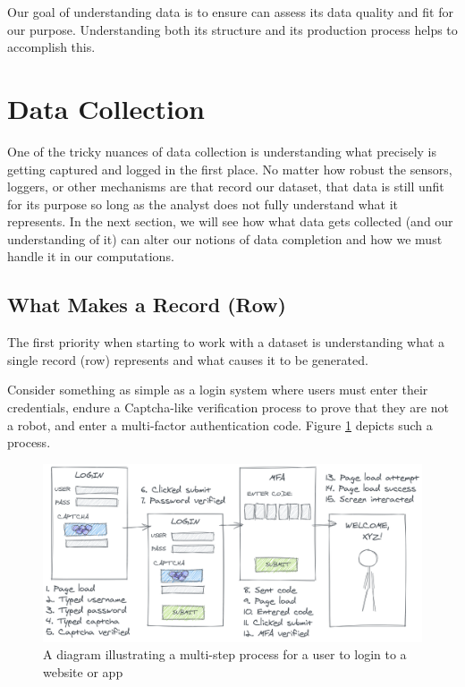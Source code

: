 \documentclass[
]{krantz}
\begin{document}
Our goal of understanding data is to ensure can assess its data quality and fit for our purpose. Understanding both its structure and its production process helps to accomplish this.

\hypertarget{data-collection}{%
\section{Data Collection}\label{data-collection}}

One of the tricky nuances of data collection is understanding what precisely is getting captured and logged in the first place.
No matter how robust the sensors, loggers, or other mechanisms are that record our dataset, that data is still unfit for its purpose so long as the analyst does not fully understand what it represents.
In the next section, we will see how what data gets collected (and our understanding of it) can alter our notions of data completion and how we must handle it in our computations.

\hypertarget{what-makes-a-record-row}{%
\subsection{What Makes a Record (Row)}\label{what-makes-a-record-row}}

The first priority when starting to work with a dataset is understanding what a single record (row) represents and what causes it to be generated.

Consider something as simple as a login system where users must enter their credentials, endure a Captcha-like verification process to prove that they are not a robot, and enter a multi-factor authentication code. Figure \ref{fig:login-log} depicts such a process.

\begin{figure}

{\centering \includegraphics[width=0.9\linewidth]{figures/data-dall/login-log} 

}

\caption{A diagram illustrating a multi-step process for a user to login to a website or app}\label{fig:login-log}
\end{figure}
\end{document}
